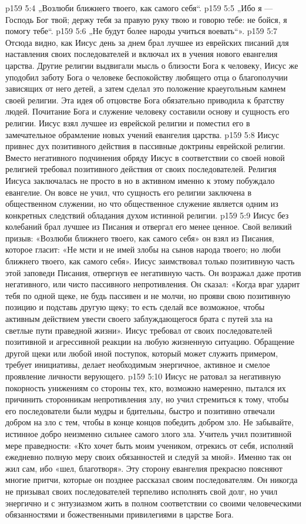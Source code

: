 \vs p159 5:4 \pc „Возлюби ближнего твоего, как самого себя“.
\vs p159 5:5 \pc „Ибо я --- Господь Бог твой; держу тебя за правую руку твою и говорю тебе: не бойся, я помогу тебе“.
\vs p159 5:6 \pc „Не будут более народы учиться воевать“».
\vs p159 5:7 \pc Отсюда видно, как Иисус день за днем брал лучшее из еврейских писаний для наставления своих последователей и включал их в учения нового евангелия царства. Другие религии выдвигали мысль о близости Бога к человеку, Иисус же уподобил заботу Бога о человеке беспокойству любящего отца о благополучии зависящих от него детей, а затем сделал это положение краеугольным камнем своей религии. Эта идея об отцовстве Бога обязательно приводила к братству людей. Почитание Бога и служение человеку составили основу и сущность его религии. Иисус взял лучшее из еврейской религии и поместил его в замечательное обрамление новых учений евангелия царства.
\vs p159 5:8 Иисус привнес дух позитивного действия в пассивные доктрины еврейской религии. Вместо негативного подчинения обряду Иисус в соответствии со своей новой религией требовал позитивного действия от своих последователей. Религия Иисуса заключалась не просто в  но в активном  именно к этому побуждало евангелие. Он вовсе не учил, что сущность его религии заключена в общественном служении, но что общественное служение является одним из конкретных следствий обладания духом истинной религии.
\vs p159 5:9 Иисус без колебаний брал лучшее из Писания и отвергал его менее ценное. Свой великий призыв: «Возлюби ближнего твоего, как самого себя» он взял из Писания, которое гласит: «Не мсти и не имей злобы на сынов народа твоего; но люби ближнего твоего, как самого себя». Иисус заимствовал только позитивную часть этой заповеди Писания, отвергнув ее негативную часть. Он возражал даже против негативного, или чисто пассивного непротивления. Он сказал: «Когда враг ударит тебя по одной щеке, не будь пассивен и не молчи, но прояви свою позитивную позицию и подставь другую щеку; то есть сделай все возможное, чтобы активным действием увести своего заблуждающегося брата с путей зла на светлые пути праведной жизни». Иисус требовал от своих последователей позитивной и агрессивной реакции на любую жизненную ситуацию. Обращение другой щеки или любой иной поступок, который может служить примером, требует инициативы, делает необходимым энергичное, активное и смелое проявление личности верующего.
\vs p159 5:10 Иисус не ратовал за негативную покорность унижениям со стороны тех, кто, возможно намеренно, пытался их причинить сторонникам непротивления злу, но учил стремиться к тому, чтобы его последователи были мудры и бдительны, быстро и позитивно отвечали добром на зло с тем, чтобы в конце концов победить добром зло. Не забывайте, истинное добро неизменно сильнее самого злого зла. Учитель учил позитивной мере праведности: «Кто хочет быть моим учеником, отрекись от себя, исполняй ежедневно полную меру своих обязанностей и следуй за мной». Именно так он жил сам, ибо «шел, благотворя». Эту сторону евангелия прекрасно поясняют многие притчи, которые он позднее рассказал своим последователям. Он никогда не призывал своих последователей терпеливо исполнять свой долг, но учил энергично и с энтузиазмом жить в полном соответствии со своими человеческими обязанностями и божественными привилегиями в царстве Бога.
